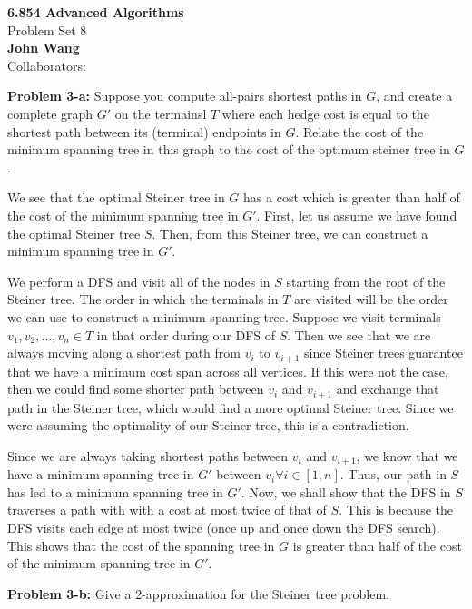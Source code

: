 \documentclass[psamsfonts]{amsart}
\newenvironment{sol}{\vspace{0.25cm}{\large \bfseries Solution:}}{\qedsymbol}
\newenvironment{prob}[1]{\begin{framed}{\large \bfseries Problem #1:}}{\end{framed}}
\newcommand{\makenewtitle}{
    \begin{center}
    {\huge \bfseries 6.854 Advanced Algorithms} \\
    Problem Set 8\\
    \vspace{0.25cm}
    {\bfseries John Wang} \\
    Collaborators:  
    \end{center}
    \vspace{0.5cm}
}
\begin{document}
\newpage
\makenewtitle

\begin{prob}{3-a}
Suppose you compute all-pairs shortest paths in $G$, and create a complete graph $G'$ on the termainsl $T$ where each hedge cost is equal to the shortest path between its (terminal) endpoints in $G$. Relate the cost of the minimum spanning tree in this graph to the cost of the optimum steiner tree in $G$. 
\end{prob}
\begin{sol}
We see that the optimal Steiner tree in $G$ has a cost which is greater than half of the cost of the minimum spanning tree in $G'$. First, let us assume we have found the optimal Steiner tree $S$. Then, from this Steiner tree, we can construct a minimum spanning tree in $G'$. 

We perform a DFS and visit all of the nodes in $S$ starting from the root of the Steiner tree. The order in which the terminals in $T$ are visited will be the order we can use to construct a minimum spanning tree. Suppose we visit terminals $v_1, v_2, \ldots, v_n \in T$ in that order during our DFS of $S$. Then we see that we are always moving along a shortest path from $v_i$ to $v_{i+1}$ since Steiner trees guarantee that we have a minimum cost span across all vertices. If this were not the case, then we could find some shorter path between $v_i$ and $v_{i+1}$ and exchange that path in the Steiner tree, which would find a more optimal Steiner tree. Since we were assuming the optimality of our Steiner tree, this is a contradiction. 

Since we are always taking shortest paths between $v_{i}$ and $v_{i+1}$, we know that we have a minimum spanning tree in $G'$ between $v_{i} \forall i \in [1, n]$. Thus, our path in $S$ has led to a minimum spanning tree in $G'$. Now, we shall show that the DFS in $S$ traverses a path with with a cost at most twice of that of $S$. This is because the DFS visits each edge at most twice (once up and once down the DFS search). This shows that the cost of the spanning tree in $G$ is greater than half of the cost of the minimum spanning tree in $G'$. 
\end{sol}

\begin{prob}{3-b}
Give a 2-approximation for the Steiner tree problem.
\end{prob}
\begin{sol}

\end{sol}
\end{document}
